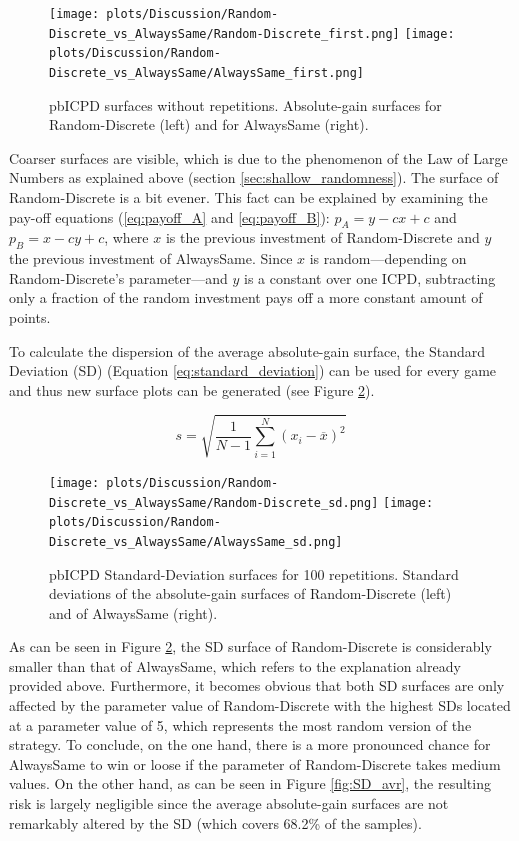 \documentclass[11pt]{article}
\begin{document}
	\begin{figure}[h]
		\centering
		\texttt{[image: plots/Discussion/Random-Discrete\_vs\_AlwaysSame/Random-Discrete\_first.png]}
		\texttt{[image: plots/Discussion/Random-Discrete\_vs\_AlwaysSame/AlwaysSame\_first.png]}\\
		\caption{pbICPD surfaces without repetitions. Absolute-gain surfaces for Random-Discrete (left) and for AlwaysSame (right).}
		\label{fig:two_one-iter}
	\end{figure}

	\noindent
	Coarser surfaces are visible, which is due to the phenomenon of the Law of Large Numbers as explained above (section \ref{sec:shallow_randomness}).
	The surface of Random-Discrete is a bit evener. 
	This fact can be explained by examining the pay-off equations (\ref{eq:payoff_A} and \ref{eq:payoff_B}):
	$p_A = y - c x + c$ and $p_B = x - c y + c$, where $x$ is the previous investment of Random-Discrete and $y$ the previous investment of AlwaysSame.
	Since $x$ is random---depending on Random-Discrete's parameter---and $y$ is a constant over one ICPD, subtracting only a fraction of the random investment pays off a more constant amount of points.

	To calculate the dispersion of the average absolute-gain surface, the Standard Deviation (SD) (Equation \ref{eq:standard_deviation}) can be used for every game and thus new surface plots can be generated (see Figure \ref{fig:two_one-iter_sd}). 

	\begin{equation}
		s = \sqrt{\frac{1}{N-1} \sum_{i=1}^N (x_i - \overline{x})^2}
		\label{eq:standard_deviation}
	\end{equation}

	\begin{figure}[htbp]
		\centering
		\texttt{[image: plots/Discussion/Random-Discrete\_vs\_AlwaysSame/Random-Discrete\_sd.png]}
		\texttt{[image: plots/Discussion/Random-Discrete\_vs\_AlwaysSame/AlwaysSame\_sd.png]}
		\caption{pbICPD Standard-Deviation surfaces for 100 repetitions. Standard deviations of the absolute-gain surfaces of Random-Discrete (left) and of AlwaysSame (right).}
		\label{fig:two_one-iter_sd}
	\end{figure}

	As can be seen in Figure \ref{fig:two_one-iter_sd}, the SD surface of Random-Discrete is considerably smaller than that of AlwaysSame, which refers to the explanation already provided above.
	Furthermore, it becomes obvious that both SD surfaces are only affected by the parameter value of Random-Discrete with the highest SDs located at a parameter value of 5, which represents the most random version of the strategy. 
	To conclude, on the one hand, there is a more pronounced chance for AlwaysSame to win or loose if the parameter of Random-Discrete takes medium values.
	On the other hand, as can be seen in Figure \ref{fig:SD_avr}, the resulting risk is largely negligible since the average absolute-gain surfaces are not remarkably altered by the SD (which covers 68.2\% of the samples).
\end{document}
